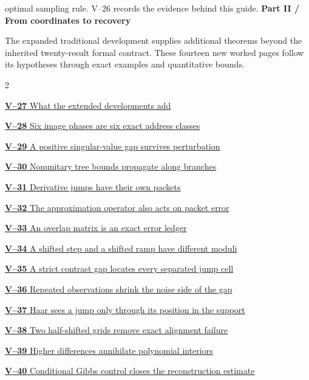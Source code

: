 \documentclass[11pt,a4paper]{article}
\begin{document}
optimal sampling rule. V--26 records the evidence behind this guide.
\clearpage
{}
{\sffamily\bfseries\Large\color{accent}Part II / From coordinates to recovery}\par\medskip
The expanded traditional development supplies additional theorems beyond the
inherited twenty-result formal contract. These fourteen new worked pages
follow its hypotheses through exact examples and quantitative bounds.
\medskip
\begin{multicols}{2}
{\small\noindent\hyperlink{vpage27}{\textbf{V--27} What the extended developments add}\par\medskip}
{\small\noindent\hyperlink{vpage28}{\textbf{V--28} Six image phases are six exact address classes}\par\medskip}
{\small\noindent\hyperlink{vpage29}{\textbf{V--29} A positive singular-value gap survives perturbation}\par\medskip}
{\small\noindent\hyperlink{vpage30}{\textbf{V--30} Nonunitary tree bounds propagate along branches}\par\medskip}
{\small\noindent\hyperlink{vpage31}{\textbf{V--31} Derivative jumps have their own packets}\par\medskip}
{\small\noindent\hyperlink{vpage32}{\textbf{V--32} The approximation operator also acts on packet error}\par\medskip}
{\small\noindent\hyperlink{vpage33}{\textbf{V--33} An overlap matrix is an exact error ledger}\par\medskip}
{\small\noindent\hyperlink{vpage34}{\textbf{V--34} A shifted step and a shifted ramp have different moduli}\par\medskip}
{\small\noindent\hyperlink{vpage35}{\textbf{V--35} A strict contrast gap locates every separated jump cell}\par\medskip}
{\small\noindent\hyperlink{vpage36}{\textbf{V--36} Repeated observations shrink the noise side of the gap}\par\medskip}
{\small\noindent\hyperlink{vpage37}{\textbf{V--37} Haar sees a jump only through its position in the support}\par\medskip}
{\small\noindent\hyperlink{vpage38}{\textbf{V--38} Two half-shifted grids remove exact alignment failure}\par\medskip}
{\small\noindent\hyperlink{vpage39}{\textbf{V--39} Higher differences annihilate polynomial interiors}\par\medskip}
{\small\noindent\hyperlink{vpage40}{\textbf{V--40} Conditional Gibbs control closes the reconstruction estimate}\par\medskip}
\end{multicols}
\end{document}
